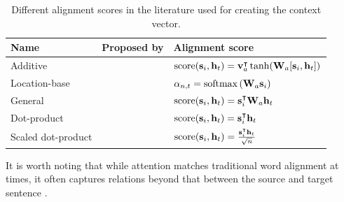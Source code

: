 \begin{table}
\centering
\small
\begin{tabularx}{0.93\linewidth}{lll}
 \toprule
\textbf{Name} & \textbf{Proposed by} & \textbf{Alignment score}  \\ \midrule
Additive & \citet{DBLP:journals/corr/BahdanauCB14} & $\text{score}(\bm{\mathbf{s}}_i, \bm{\mathbf{h}}_t) = \bm{\mathbf{v}}^\intercal_a \tanh (\bm{\mathbf{W}}_a[\bm{\mathbf{s}}_i, \bm{\mathbf{h}}_t])$ \\
 Location-base	 & \citet{luong:2015:EMNLP} & $\alpha_{n, t} = \operatorname*{softmax}\,(\bm{\mathbf{W}}_a\bm{\mathbf{s}}_i) $ \\
General	 &  \citet{luong:2015:EMNLP} & $ \text{score}(\bm{\mathbf{s}}_i, \bm{\mathbf{h}}_t) = \bm{\mathbf{s}}^\intercal_i  \bm{\mathbf{W}}_a  \bm{\mathbf{h}}_t $ \\
Dot-product	 &  \citet{luong:2015:EMNLP} & $\text{score}(\bm{\mathbf{s}}_i, \bm{\mathbf{h}}_t) = \bm{\mathbf{s}}^\intercal_i \bm{\mathbf{h}}_t  $ \\
 Scaled dot-product & \citet{vaswani2017attention} & $\text{score}(\bm{\mathbf{s}}_i, \bm{\mathbf{h}}_t) = \frac{\bm{\mathbf{s}}^\intercal_i \bm{\mathbf{h}}_t }{\sqrt{n}} $ \\
\bottomrule
\end{tabularx}
\caption{Different alignment scores in the literature used for creating the context vector. }
\label{backgroundattentions}
\end{table}

It is worth noting that while attention matches traditional word alignment at times, it often captures relations beyond that between the source and target sentence \citep{ghader-monz-2017-attention,koehn2017six}.

